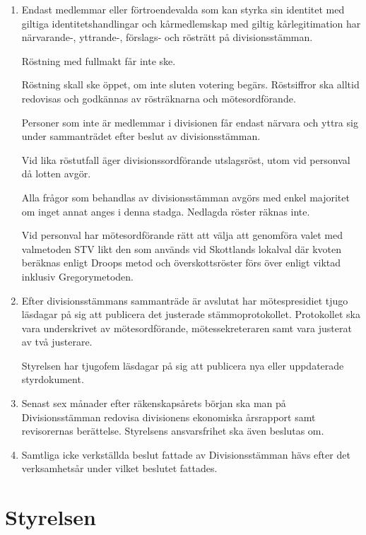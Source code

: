 \documentclass{dvd}
\begin{document}
\begin{enumerate}[label=\arabic* §, ref=\arabic*]
		Om färre än 10 medlemmar är närvarande då beslut ska fattas, kan detta endast ske om ingen yrkar på bordläggning.

		\item Endast medlemmar eller förtroendevalda som kan styrka sin identitet med giltiga identitetshandlingar och kårmedlemskap med giltig kårlegitimation har närvarande-, yttrande-, förslags- och rösträtt på divisionsstämman.

		Röstning med fullmakt får inte ske.

		Röstning skall ske öppet, om inte sluten votering begärs.
		Röstsiffror ska alltid redovisas och godkännas av rösträknarna och mötesordförande.

		Personer som inte är medlemmar i divisionen får endast närvara och yttra sig under sammanträdet efter beslut av divisionsstämman.

		Vid lika röstutfall äger divisionssordförande utslagsröst, utom vid personval då lotten avgör.

		Alla frågor som behandlas av divisionsstämman avgörs med enkel majoritet om inget annat anges i denna stadga.
		Nedlagda röster räknas inte.

		Vid personval har mötesordförande rätt att välja att genomföra valet med valmetoden STV likt den som används vid Skottlands lokalval där kvoten beräknas enligt Droops metod och överskottsröster förs över enligt viktad inklusiv Gregorymetoden.

		\item Efter divisionsstämmans sammanträde är avslutat har mötespresidiet tjugo läsdagar på sig att publicera det justerade stämmoprotokollet.
		Protokollet ska vara underskrivet av mötesordförande, mötessekreteraren samt vara justerat av två justerare.

		Styrelsen har tjugofem läsdagar på sig att publicera nya eller uppdaterade styrdokument.

		\item Senast sex månader efter räkenskapsårets början ska man på Divisionsstämman redovisa divisionens ekonomiska årsrapport samt revisorernas berättelse.
		Styrelsens ansvarsfrihet ska även beslutas om.

                \item Samtliga icke verkställda beslut fattade av Divisionsstämman hävs efter det verksamhetsår under vilket beslutet fattades.
	\end{enumerate}

	\section{Styrelsen}
\end{document}
